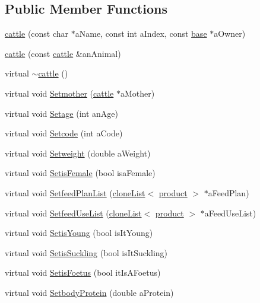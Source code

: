 \subsection*{Public Member Functions}
\begin{DoxyCompactItemize}
\item 
\hyperlink{classcattle_adf9d179e58cd2a02b9b5e0f8a1668bb9}{cattle} (const char $\ast$aName, const int aIndex, const \hyperlink{classbase}{base} $\ast$aOwner)
\item 
\hyperlink{classcattle_a1588b725bd7fe6e3fe250007ebfc0785}{cattle} (const \hyperlink{classcattle}{cattle} \&anAnimal)
\item 
virtual \hyperlink{classcattle_ab9a244e71daafd2dec8ecaf18aa0c081}{$\sim$cattle} ()
\item 
virtual void \hyperlink{classcattle_ad80178c5a27de60a10542207d47ec2c2}{Setmother} (\hyperlink{classcattle}{cattle} $\ast$aMother)
\item 
virtual void \hyperlink{classcattle_aa064459116b771e6a3c9b2dac34ce0bf}{Setage} (int anAge)
\item 
virtual void \hyperlink{classcattle_a36dd85ccca1fde2101b13e148951e280}{Setcode} (int aCode)
\item 
virtual void \hyperlink{classcattle_a89311923c18e5e7abbd67339f150a077}{Setweight} (double aWeight)
\item 
virtual void \hyperlink{classcattle_a3277350bb7f701195d624d9ee10a2f5b}{SetisFemale} (bool isaFemale)
\item 
virtual void \hyperlink{classcattle_a1a2411237f113c80e1b8aff941aa937c}{SetfeedPlanList} (\hyperlink{classclone_list}{cloneList}$<$ \hyperlink{classproduct}{product} $>$ $\ast$aFeedPlan)
\item 
virtual void \hyperlink{classcattle_a5bb985f9fe851b8850c06a6457e9f8c7}{SetfeedUseList} (\hyperlink{classclone_list}{cloneList}$<$ \hyperlink{classproduct}{product} $>$ $\ast$aFeedUseList)
\item 
virtual void \hyperlink{classcattle_a4c094d809f6ea65502d06a96dc42e08d}{SetisYoung} (bool isItYoung)
\item 
virtual void \hyperlink{classcattle_a70296e4b60d7540a8be2be7beca964ca}{SetisSuckling} (bool isItSuckling)
\item 
virtual void \hyperlink{classcattle_a9040755a92eba6fcd6a71b907e06ef95}{SetisFoetus} (bool itIsAFoetus)
\item 
virtual void \hyperlink{classcattle_ad9f7a3fc99cb90f4634ea36a8af5b15d}{SetbodyProtein} (double aProtein)
\item 

\end{DoxyCompactItemize}
